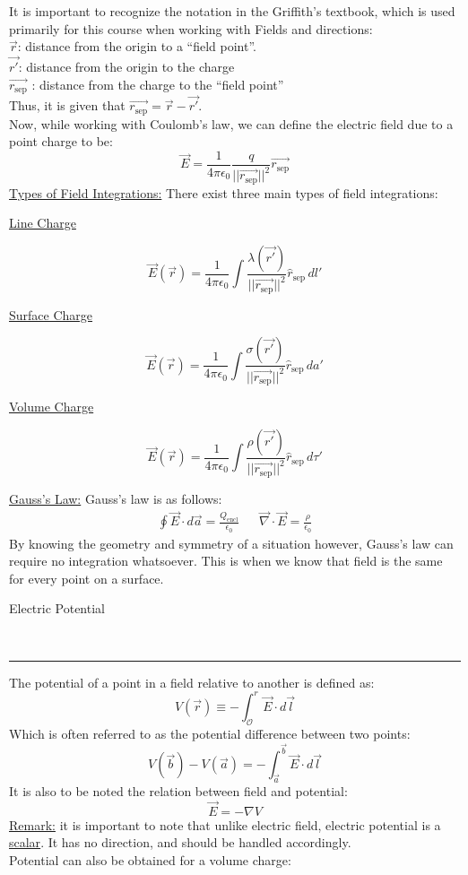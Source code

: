 \documentclass{article}
\newcommand{\sepvec}{\vec{r_\textrm{sep}}}
\newcommand{\sephat}{\hat{r}_{\textrm{sep}}}
\newcommand{\header}[1]{\begin{large}\noindent #1\end{large}\\\rule{\textwidth}{0.5pt}}
\newcommand{\gap}{\medskip\\}
\newcommand{\centertext}[1]{\begin{center}#1\end{center}}
\newcommand{\sheader}[1]{\underline{#1:}}
\newcommand{\sgap}{\smallskip\\}
\begin{document}
It is important to recognize the notation in the Griffith's textbook, which is used
primarily for this course when working with Fields and directions:
\sgap
$\vec{r}$: distance from the origin to a ``field point''.\\
$\vec{r'}$: distance from the origin to the charge\\
$\sepvec$ : distance from the charge to the ``field point''\\
Thus, it is given that $\sepvec = \vec{r} - \vec{r'}$.
\gap
Now, while working with Coulomb's law, we can define the electric field due to a point charge to be:
\[
    \vec{E} = \frac{1}{4\pi \epsilon_0} \frac{q}{||\sepvec||^2}\sepvec    
\]
\sheader{Types of Field Integrations} There exist three main types of field integrations:
\begin{multicols}{3}
    \centertext{\underline{Line Charge}}
    \[
        \vec{E}(\vec{r}) = \frac{1}{4 \pi \epsilon_0}\int{\frac{\lambda(\vec{r'})}{||\sepvec||^2}\sephat \, dl'}    
    \]
    \vfill\null\columnbreak
    \centertext{\underline{Surface Charge}}
    \[
        \vec{E}(\vec{r}) = \frac{1}{4\pi\epsilon_0}\int{\frac{\sigma(\vec{r'})}{||\sepvec||^2}\sephat \, da'}    
    \]
    \vfill\null\columnbreak
    \centertext{\underline{Volume Charge}}
    \[
        \vec{E}(\vec{r}) = \frac{1}{4\pi\epsilon_0}\int{\frac{\rho(\vec{r'})}{||\sepvec||^2}\sephat \, d\tau'}    
    \]
    \vfill\null
\end{multicols}
\sheader{Gauss's Law} Gauss's law is as follows:
\begin{align*}
    \oint{\vec{E} \cdot d\vec{a}} = \frac{Q_\textrm{encl}}{\epsilon_0} && \vec{\nabla} \cdot \vec{E} = \frac{\rho}{\epsilon_0}
\end{align*}
By knowing the geometry and symmetry of a situation however, Gauss's law can require
no integration whatsoever. This is when we know that field is the same for every point
on a surface. 
\gap
\header{Electric Potential}
The potential of a point in a field relative to another is defined as:
\[
    V(\vec{r}) \equiv - \int_{\mathcal{O}}^r \vec{E} \cdot d\vec{l}    
\]
Which is often referred to as the potential difference between two points:
\[
    V(\vec{b}) - V(\vec{a}) = - \int_{\vec{a}}^{\vec{b}}{\vec{E} \cdot d\vec{l}}
\]
It is also to be noted the relation between field and potential:
\[
    \vec{E} = - \nabla V    
\]
\sheader{Remark} it is important to note that unlike electric field, electric potential
is a \underline{scalar}. It has no direction, and should be handled accordingly.
\gap
Potential can also be obtained for a volume charge:
\end{document}
